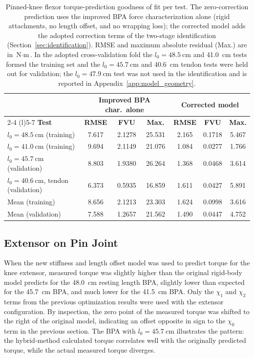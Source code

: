 \begin{table}[htbp]
\caption{Pinned-knee flexor torque-prediction goodness of fit per test. The zero-correction prediction uses the improved BPA force characterization alone (rigid attachments, no length offset, and no wrapping loss); the corrected model adds the adopted correction terms of the two-stage identification (Section~\ref{sec:identification}). RMSE and maximum absolute residual (Max.) are in $\text{N}\cdot\text{m}$. In the adopted cross-validation fold the $l_{0}=\qty{48.5}{\cm}$ and \qty{41.0}{\cm} tests formed the training set and the $l_{0}=\qty{45.7}{\cm}$ and \qty{40.6}{\cm} tendon tests were held out for validation; the $l_{0}=\qty{47.9}{\cm}$ test was not used in the identification and is reported in Appendix~\ref{app:model_geometry}.}
\label{tab:FlxPinGof}
\begin{tabular}{@{}lcccccc@{}}
\toprule
& \multicolumn{3}{c}{\textbf{Improved BPA char.\ alone}} & \multicolumn{3}{c}{\textbf{Corrected model}} \\
\cmidrule(lr){2-4} \cmidrule(l){5-7}
\textbf{Test} & \textbf{RMSE} & \textbf{FVU} & \textbf{Max.} & \textbf{RMSE} & \textbf{FVU} & \textbf{Max.} \\
\midrule
$l_{0}=\qty{48.5}{\cm}$ (training)    & 7.617 & 2.1278 & 25.531 & 2.165 & 0.1718 & 5.467 \\
$l_{0}=\qty{41.0}{\cm}$ (training)    & 9.694 & 2.1149 & 21.076 & 1.084 & 0.0277 & 1.766 \\
$l_{0}=\qty{45.7}{\cm}$ (validation)  & 8.803 & 1.9380 & 26.264 & 1.368 & 0.0468 & 3.614 \\
$l_{0}=\qty{40.6}{\cm}$, tendon (validation) & 6.373 & 0.5935 & 16.859 & 1.611 & 0.0427 & 5.891 \\
\midrule
Mean (training)                       & 8.656 & 2.1213 & 23.303 & 1.624 & 0.0998 & 3.616 \\
Mean (validation)                     & 7.588 & 1.2657 & 21.562 & 1.490 & 0.0447 & 4.752 \\
\bottomrule
\end{tabular}
\end{table}

\subsection{Extensor on Pin Joint}

When the new stiffness and length offset model was used to predict torque for the knee extensor, measured torque was slightly higher than the original rigid-body model predicts for the \qty{48.0}{\cm} resting length BPA, slightly lower than expected for the \qty{45.7}{\cm} BPA, and much lower for the \qty{41.5}{\cm} BPA. Only the $\chi_{1}$ and $\chi_{2}$ terms from the previous optimization results were used with the extensor configuration. By inspection, the zero point of the measured torque was shifted to the right of the original model, indicating an offset opposite in sign to the $\chi_{0}$ term in the previous section. The BPA with $l_{0}=\qty{45.7}{\cm}$ illustrates the pattern: the hybrid-method calculated torque correlates well with the originally predicted torque, while the actual measured torque diverges. 

